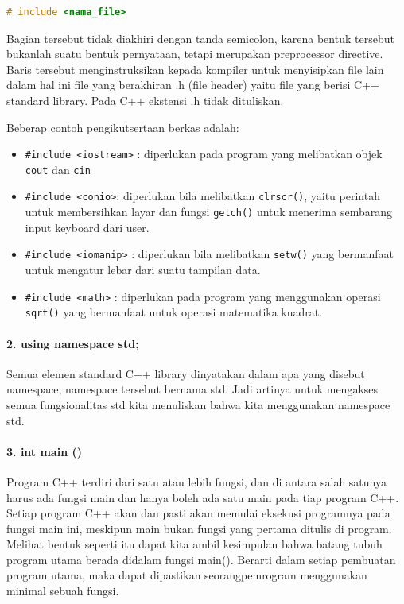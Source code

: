 \begin{lstlisting}[language=c++, numbers=none]
# include <nama_file>
\end{lstlisting}

Bagian tersebut tidak diakhiri dengan tanda semicolon, karena bentuk
tersebut bukanlah suatu bentuk pernyataan, tetapi merupakan preprocessor
directive. Baris tersebut menginstruksikan kepada kompiler untuk
menyisipkan file lain dalam hal ini file yang berakhiran .h (file
header) yaitu file yang berisi C++ standard library. Pada C++ ekstensi
.h tidak dituliskan.

Beberap contoh pengikutsertaan berkas adalah:

\begin{itemize}

\item
  \texttt{\#include\ \textless{}iostream\textgreater{}} : diperlukan
  pada program yang melibatkan objek \texttt{cout} dan \texttt{cin}
\item
  \texttt{\#include\ \textless{}conio\textgreater{}}: diperlukan bila
  melibatkan \texttt{clrscr()}, yaitu perintah untuk membersihkan layar
  dan fungsi \texttt{getch()} untuk menerima sembarang input keyboard
  dari user.
\item
  \texttt{\#include\ \textless{}iomanip\textgreater{}} : diperlukan bila
  melibatkan \texttt{setw()} yang bermanfaat untuk mengatur lebar dari
  suatu tampilan data.
\item
  \texttt{\#include\ \textless{}math\textgreater{}} : diperlukan pada
  program yang menggunakan operasi \texttt{sqrt()} yang bermanfaat untuk
  operasi matematika kuadrat.
\end{itemize}

\paragraph{2. using namespace std;}\label{using-namespace-std}

Semua elemen standard C++ library dinyatakan dalam apa yang disebut
namespace, namespace tersebut bernama std. Jadi artinya untuk mengakses
semua fungsionalitas std kita menuliskan bahwa kita menggunakan
namespace std.

\paragraph{3. int main ()}\label{int-main}

Program C++ terdiri dari satu atau lebih fungsi, dan di antara salah
satunya harus ada fungsi main dan hanya boleh ada satu main pada tiap
program C++. Setiap program C++ akan dan pasti akan memulai eksekusi
programnya pada fungsi main ini, meskipun main bukan fungsi yang pertama
ditulis di program. Melihat bentuk seperti itu dapat kita ambil
kesimpulan bahwa batang tubuh program utama berada didalam fungsi
main(). Berarti dalam setiap pembuatan program utama, maka dapat
dipastikan seorangpemrogram menggunakan minimal sebuah fungsi.


